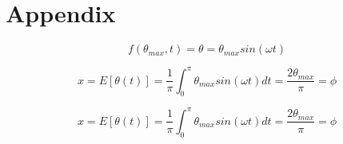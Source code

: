 \documentclass[\main/master.tex]{subfiles}
\begin{document}
\newspacing
\chapter{Appendix}\label{chapter:Appendix}

\begin{equation}
f(\theta_{max},t) = \theta  = \theta_{max} sin(\omega t)
\label{eqn:rms}
\end{equation}




\begin{equation}
x=E[\theta(t)]=\frac{1}{\pi}\int_0^{\pi}\theta_{max} sin(\omega t) dt=\frac{2 \theta_{max}}{\pi}  = \phi
\label{eqn:av}
\end{equation}

\begin{equation}
x=E[\theta(t)]=\frac{1}{\pi}\int_0^{\pi}\theta_{max} sin(\omega t) dt=\frac{2 \theta_{max}}{\pi}  = \phi
\label{eqn:av}
\end{equation}
\end{document}
